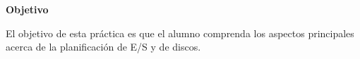 \documentclass[a4paper,11pt]{exam}
\begin{document}
\maketitle

\textbf{Objetivo}

El objetivo de esta práctica es que el alumno comprenda los aspectos principales acerca de la planificación de E/S y de discos.


\end{document}
